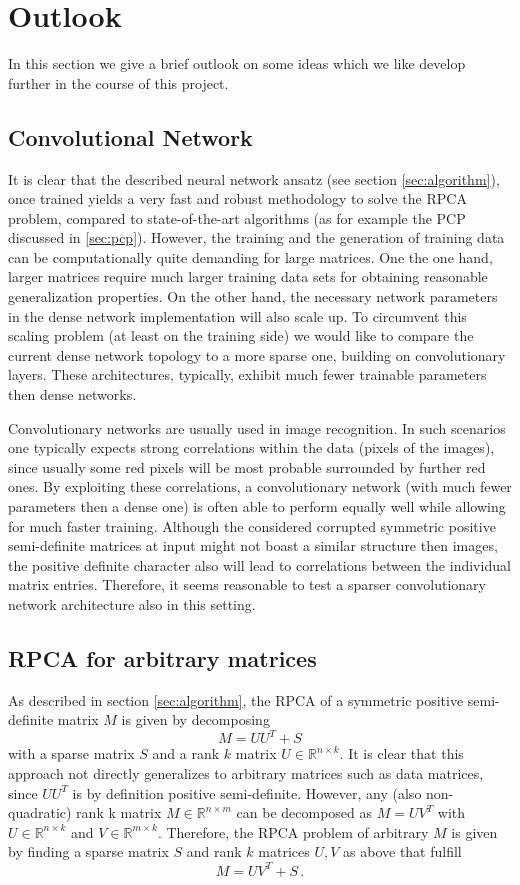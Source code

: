 \newpage
\section{Outlook}\label{sec:outlook}

In this section we give a brief outlook on some ideas which we like develop further in the course of this project.


\subsection{Convolutional Network}
It is clear that the described neural network ansatz (see section \ref{sec:algorithm}), once trained yields a very fast and robust methodology to solve the RPCA problem, compared to state-of-the-art algorithms (as for example the PCP discussed in \ref{sec:pcp}). However, the training and the generation of training data can be computationally quite demanding for large matrices. One the one hand, larger matrices require much larger training data sets for obtaining reasonable generalization properties. On the other hand, the necessary network parameters in the dense network implementation will also scale up. To circumvent this scaling problem (at least on the training side) we would like to compare the current dense network topology to a more sparse one, building on convolutionary layers. These architectures, typically, exhibit much fewer trainable parameters then dense networks.

Convolutionary networks are usually used in image recognition. In such scenarios one typically expects strong correlations within the data (pixels of the images), since usually some red pixels will be most probable surrounded by further red ones. By exploiting these correlations, a convolutionary network (with much fewer parameters then a dense one) is often able to perform equally well while allowing for much faster training. Although the considered corrupted symmetric positive semi-definite matrices at input might not boast a similar structure then images, the positive definite character also will lead to correlations between the individual matrix entries. Therefore, it seems reasonable to test a sparser convolutionary network architecture also in this setting.

\subsection{RPCA for arbitrary matrices}
As described in section \ref{sec:algorithm}, the RPCA of a symmetric positive semi-definite matrix $M$ is given by decomposing
\[
M = UU^T + S
\]
with a sparse matrix $S$ and a rank $k$ matrix $U\in\mathbb{R}^{n\times k}$. It is clear that this approach not directly generalizes to arbitrary matrices such as data matrices, since $UU^T$ is by definition positive semi-definite. However, any (also non-quadratic) rank k matrix $M\in\mathbb{R}^{n\times m}$ can be decomposed as $M = UV^T$ with $U\in\mathbb{R}^{n\times k}$ and $V\in\mathbb{R}^{m\times k}$. Therefore, the RPCA problem of arbitrary $M$ is given by finding a sparse matrix $S$ and rank $k$ matrices $U,V$ as above that fulfill
\[
M = UV^T + S \,.
\]

